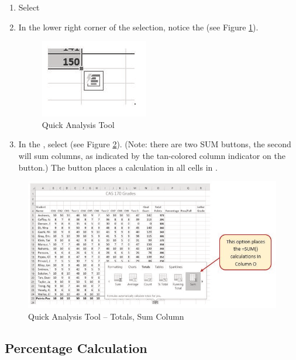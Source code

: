 \begin{enumbox}
	\begin{enumerate}
		\item Select 
		\item In the lower right corner of the selection, notice the  (see Figure \ref{03:fig04}).
	
		\begin{figure}[H]
			\centering
			\includegraphics[width=\maxwidth{.95\linewidth}]{gfx/ch03_fig04}
			\caption{Quick Analysis Tool}
			\label{03:fig04}
		\end{figure}
	
		\item In the , select  (see Figure \ref{03:fig05}). (Note: there are two SUM buttons, the second will sum columns, as indicated by the tan-colored column indicator on the button.) The  button places a  calculation in all cells in .
	\end{enumerate}
\end{enumbox}

\begin{figure}[H]
	\centering
	\includegraphics[width=\maxwidth{.95\linewidth}]{gfx/ch03_fig05}
	\caption{Quick Analysis Tool – Totals, Sum Column}
	\label{03:fig05}
\end{figure}

\subsection{Percentage Calculation}

